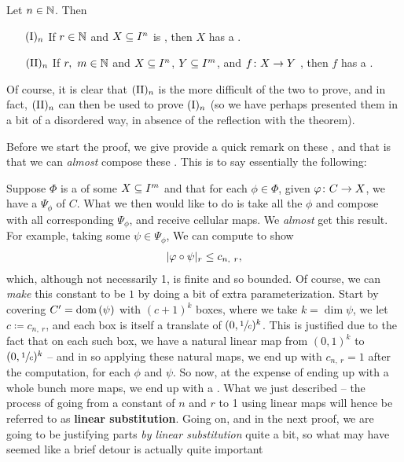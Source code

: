 \begin{theorem}[Parameterization (by Binyamini \& Novikov)]
  Let $n \in \N$. Then
    \begin{enumerate}[label={}]
    \item[$\In$ ] If $r \in \N$ and $\CIn[X]{n}$ is , then $X$ has a \cellrparam.
    \item[$\IIn$ ] If $r, \ m \in \N$ and $\CIn[X]{n}$, $\CIn[Y]{m}$, and $\funcdom{f}{X}{Y}$ , then $f$ has a \cellrparam.
  \end{enumerate}
  Of course, it is clear that $\IIn$ is the more difficult of the two to prove, and in fact, $\IIn$ can then be used to prove $\In$ (so we have perhaps presented them in a bit of a disordered way, in absence of the reflection with the \CD theorem).
  \label{thm:existence}
\end{theorem}

Before we start the proof, we give provide a quick remark on these \cellrparams, and that is that we can \emph{almost} compose these \cellrparams. This is to say essentially the following:

\begin{remark}
  Suppose $\Phi$ is a \cellrparam of some $\CIn[X]{m}$ and that for each $\phi \in \Phi$, given $\funcdom{\phi}{C}{X}$, we have a \cellrparam $\Psi_{\phi}$ of $C$. What we then would like to do is take all the $\phi$ and compose with all corresponding $\Psi_{\phi}$, and receive cellular maps. We \emph{almost} get this result. For example, taking some $\psi \in \Psi_{\phi}$, We can compute to show
    \begin{align*}
      \rnorm[r]{\phi \circ \psi} \leq c_{n, \ r},
    \end{align*}
    which, although not necessarily 1, is finite and so bounded. Of course, we can \emph{make} this constant to be $1$ by doing a bit of extra parameterization. Start by covering $\pri{C} = \dom{\psi}$ with $(c + 1)^k$ boxes, where we take $k = \dim{\psi}$, we let $c \coloneqq c_{n, \ r}$, and each box is itself a translate of $(0, \sfrac{1}{c})^k$. This is justified due to the fact that on each such box, we have a natural linear map from $(0, 1)^k$ to $(0, \sfrac{1}{c})^k$ -- and in so applying these natural maps, we end up with $c_{n, \ r} = 1$ after the computation, for each $\phi$ and $\psi$. So now, at the expense of ending up with a whole bunch more maps, we end up with a \cellrparam. What we just described -- the process of going from a constant of $n$ and $r$ to 1 using linear maps will hence be referred to as \textbf{linear substitution}. Going on, and in the next proof, we are going to be justifying parts \emph{by linear substitution} quite a bit, so what may have seemed like a brief detour is actually quite important
\end{remark}


